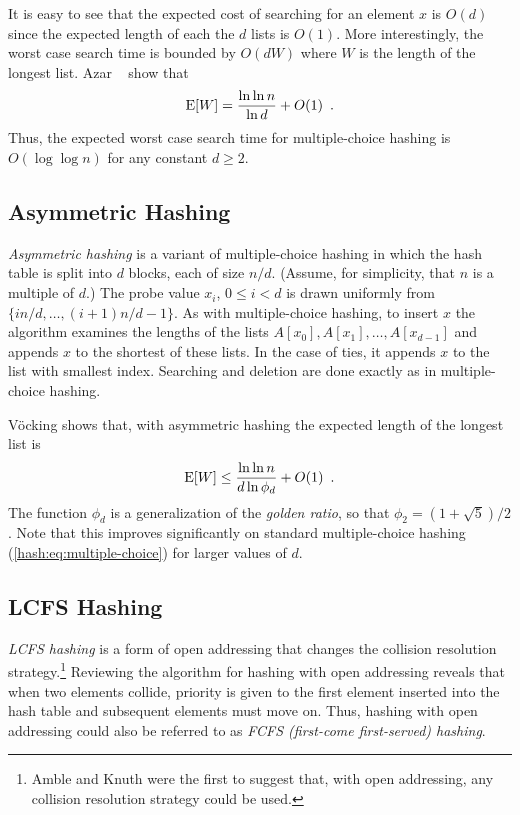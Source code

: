 It is easy to see that the expected cost of searching for an element
$x$ is $O(d)$ since the expected length of each the $d$ lists is
$O(1)$.  More interestingly, the worst case search time is bounded by
$O(dW)$ where $W$ is the length of the longest list.  Azar \etal\
\cite{abku99} show that 
\begin{equation}
    \E[W]=\frac{\ln\ln n}{\ln d} + O(1) \enspace .
	\label{hash:eq:multiple-choice} 
\end{equation}
Thus, the expected worst case search time for multiple-choice hashing
is $O(\log\log n)$ for any constant $d\ge 2$.


\subsection{Asymmetric Hashing}

\emph{Asymmetric hashing} is a variant of multiple-choice hashing in
which the hash table is split into $d$ blocks, each of size $n/d$.
(Assume, for simplicity, that $n$ is a multiple of $d$.) The probe
value $x_i$, $0\le i< d$ is drawn uniformly from
$\{in/d,\ldots,(i+1)n/d-1\}$.   As with multiple-choice hashing, to
insert $x$ the algorithm examines the lengths of the lists $A[x_0],
A[x_1],\ldots,A[x_{d-1}]$ and appends $x$ to the shortest of these
lists.  In the case of ties, it appends $x$ to the list with smallest
index.  Searching and deletion are done exactly as in multiple-choice
hashing.

V\"ocking \cite{v99} shows that, with asymmetric hashing the expected
length of the longest list is 
\[
   \mathrm{E}[W] \le \frac{\ln\ln n}{d\ln\phi_d} +O(1) \enspace .
\] 
The function $\phi_d$ is a generalization of the \emph{golden
ratio},
so that $\phi_2=(1+\sqrt{5})/2$.  Note that this improves
significantly on standard multiple-choice hashing (\ref{hash:eq:multiple-choice}) for larger values of
$d$.

\subsection{LCFS Hashing}

\emph{LCFS hashing} is a form of open addressing that changes the
collision resolution strategy.\footnote{Amble and Knuth \cite{ak74}
were the first to suggest that, with open addressing, any collision
resolution strategy could be used.} Reviewing the algorithm for
hashing with open addressing reveals that when two elements collide,
priority is given to the first element inserted into the hash table
and subsequent elements must move on.  Thus, hashing with open
addressing could also be referred to as \emph{FCFS (first-come
first-served) hashing}.

